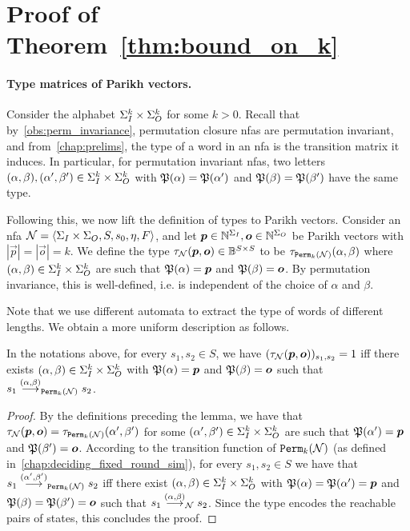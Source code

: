 \section{Proof of Theorem~\ref{thm:bound_on_k}}
\label{sec:proof_of_bound}

\paragraph*{Type matrices of Parikh vectors.}
Consider the alphabet $\Sigma_{I}^k\times \Sigma_{O}^k$ for some $k>0$.
Recall that by~\cref{obs:perm_invariance}, permutation closure \glspl{nfa} are permutation invariant, and from~\cref{chap:prelims}, the type of a word in an \gls{nfa} is the transition matrix it induces.
In particular, for permutation invariant \glspl{nfa}, two letters $(\alpha,\beta),(\alpha',\beta')\in \Sigma_{I}^k\times \Sigma_{O}^k$ with $\mathfrak{P}(\alpha)=\mathfrak{P}(\alpha')$ and $\mathfrak{P}(\beta)=\mathfrak{P}(\beta')$ have the same type.

Following this, we now lift the definition of types to Parikh vectors. Consider an \gls{nfa} $\mathcal{N}=\left< \Sigma_{I}\times \Sigma_{O},S,s_0,\eta,F\right>$, and let $\boldsymbol{p}\in \mathbb{N}^{\Sigma_{I}},\boldsymbol{o}\in \mathbb{N}^{\Sigma_{O}}$ be Parikh vectors with $|\vec{p}|=|\vec{o}|=k$. We define the type $\tau_{\mathcal{N}}(\boldsymbol{p},\boldsymbol{o})\in \mathbb{B}^{S\times S}$ to be $\tau_{{\mathtt{Perm}}_k(\mathcal{N})}(\alpha,\beta)$ where $(\alpha,\beta)\in \Sigma_{I}^k\times \Sigma_{O}^k$ are such that $\mathfrak{P}(\alpha)=\boldsymbol{p}$ and $\mathfrak{P}(\beta)=\boldsymbol{o}$. By permutation invariance, this is well-defined, i.e. is independent of the choice of $\alpha$ and $\beta$.

Note that we use different automata to extract the type of words of different lengths. We obtain a more uniform description as follows.
\begin{lemma}
\label{lem:type_of_parikh}
    In the notations above, for every $s_1,s_2\in S$, we have $(\tau_{\mathcal{N}}(\boldsymbol{p},\boldsymbol{o}))_{s_1,s_2}=1$ iff there exists $(\alpha,\beta)\in \Sigma_{I}^k\times \Sigma_{O}^k$ with $\mathfrak{P}(\alpha)=\boldsymbol{p}$ and $\mathfrak{P}(\beta)=\boldsymbol{o}$ such that $s_1\stackrel{(\alpha,\beta)}{\longrightarrow}_{{\mathtt{Perm}}_k(\mathcal{N})}s_2$.
\end{lemma}
\begin{proof}
    By the definitions preceding the lemma, we have that $\tau_{\mathcal{N}}(\boldsymbol{p},\boldsymbol{o})=\tau_{{\mathtt{Perm}}_k(\mathcal{N})}(\alpha',\beta')$ for some $(\alpha',\beta')\in \Sigma_{I}^k\times \Sigma_{O}^k$ are such that $\mathfrak{P}(\alpha')=\boldsymbol{p}$ and $\mathfrak{P}(\beta')=\boldsymbol{o}$. According to the transition function of ${\mathtt{Perm}}_k(\mathcal{N})$ (as defined in~\cref{chap:deciding_fixed_round_sim}), for every $s_1,s_2\in S$ we have that $s_1\stackrel{(\alpha',\beta')}{\longrightarrow}_{{\mathtt{Perm}}_k(\mathcal{N})}s_2$ iff there exist $(\alpha,\beta)\in \Sigma_{I}^k\times \Sigma_{O}^k$ with $\mathfrak{P}(\alpha)=\mathfrak{P}(\alpha')=\boldsymbol{p}$ and $\mathfrak{P}(\beta)=\mathfrak{P}(\beta')=\boldsymbol{o}$ such that $s_1\stackrel{(\alpha,\beta)}{\longrightarrow}_{\mathcal{N}}s_2$. Since the type encodes the reachable pairs of states, this concludes the proof.
\end{proof}

